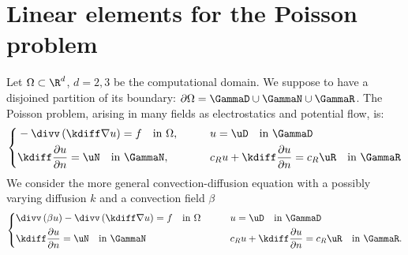 %
\section{Linear elements for the Poisson problem}\label{sec:PoissonP1}
%
Let $\Omega\subset \R^d$, $d=2,3$ be the computational domain. We suppose to have a disjoined partition of its boundary:
$\partial\Omega=\GammaD\cup\GammaN\cup\GammaR$.
%
The Poisson problem, arising in many fields as electrostatics and potential flow, is:
%
\begin{equation}\label{eq:Poisson}
%
\left\{
\begin{aligned}
&-\divv\left(\kdiff \nabla u\right) = f \quad \mbox{in $\Omega$},&\qquad&
u = \uD \quad \mbox{in $\GammaD$}\\
&\kdiff\frac{\partial u}{\partial n} = \uN \quad \mbox{in $\GammaN$},&\qquad&
c_R u + \kdiff\frac{\partial u}{\partial n}= c_R\uR \quad \mbox{in $\GammaR$}
\end{aligned}
\right.
%
\end{equation}
%
We consider the more general convection-diffusion equation with a possibly varying diffusion 
$k$ and a convection field $\beta$
%
\begin{equation}\label{eq:ConvectionDiffusion}
%
\left\{
\begin{aligned}
&\divv\left(\beta u\right)-\divv\left(\kdiff\nabla u\right) = f \quad \mbox{in $\Omega$}&\qquad&
u = \uD \quad \mbox{in $\GammaD$}\\
&\kdiff\frac{\partial u}{\partial n} = \uN \quad \mbox{in $\GammaN$}&\qquad&
c_R u + \kdiff\frac{\partial u}{\partial n}= c_R\uR \quad \mbox{in $\GammaR$}.
\end{aligned}
\right.
%
\end{equation}
%
%
